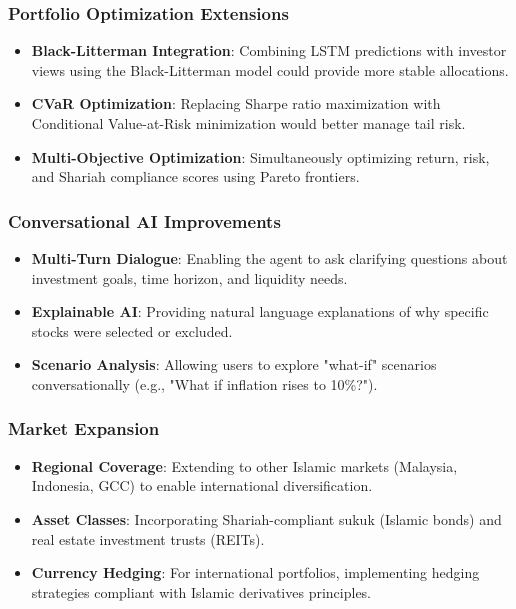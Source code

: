 \documentclass[conference]{IEEEtran}
\begin{document}
\subsubsection{Portfolio Optimization Extensions}
\begin{itemize}
\item \textbf{Black-Litterman Integration}: Combining LSTM predictions with investor views using the Black-Litterman model could provide more stable allocations.
\item \textbf{CVaR Optimization}: Replacing Sharpe ratio maximization with Conditional Value-at-Risk minimization would better manage tail risk.
\item \textbf{Multi-Objective Optimization}: Simultaneously optimizing return, risk, and Shariah compliance scores using Pareto frontiers.
\end{itemize}

\subsubsection{Conversational AI Improvements}
\begin{itemize}
\item \textbf{Multi-Turn Dialogue}: Enabling the agent to ask clarifying questions about investment goals, time horizon, and liquidity needs.
\item \textbf{Explainable AI}: Providing natural language explanations of why specific stocks were selected or excluded.
\item \textbf{Scenario Analysis}: Allowing users to explore "what-if" scenarios conversationally (e.g., "What if inflation rises to 10\%?").
\end{itemize}

\subsubsection{Market Expansion}
\begin{itemize}
\item \textbf{Regional Coverage}: Extending to other Islamic markets (Malaysia, Indonesia, GCC) to enable international diversification.
\item \textbf{Asset Classes}: Incorporating Shariah-compliant sukuk (Islamic bonds) and real estate investment trusts (REITs).
\item \textbf{Currency Hedging}: For international portfolios, implementing hedging strategies compliant with Islamic derivatives principles.
\end{itemize}
\end{document}
